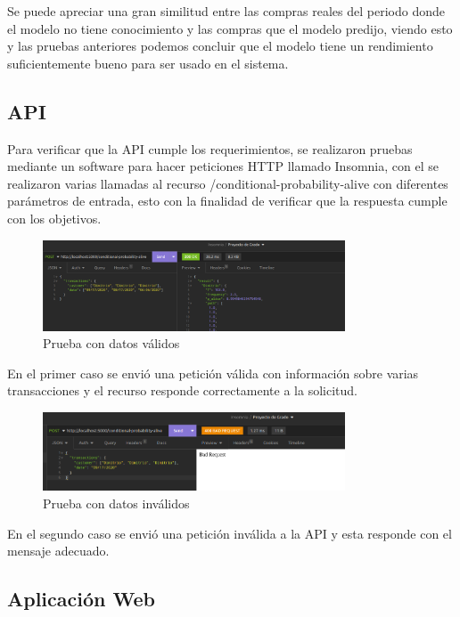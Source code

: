 Se puede apreciar una gran similitud entre las compras reales del periodo donde el modelo no tiene conocimiento y las compras que el modelo predijo, viendo esto y las pruebas anteriores podemos concluir que el modelo tiene un rendimiento suficientemente bueno para ser usado en el sistema.

\subsection{API}

Para verificar que la API cumple los requerimientos, se realizaron pruebas mediante un software para hacer peticiones HTTP llamado Insomnia, con el se realizaron varias llamadas al recurso /conditional-probability-alive con diferentes parámetros de entrada, esto con la finalidad de verificar que la respuesta cumple con los objetivos.

\begin{figure}[H]
	\centering \includegraphics[width=0.80\textwidth]{images/3.png}
	\caption{Prueba con datos válidos}
	\label{fig:api1}
\end{figure}

En el primer caso se envió una petición válida con información sobre varias transacciones y el recurso responde correctamente a la solicitud.

\begin{figure}[H]
	\centering \includegraphics[width=0.80\textwidth]{images/4.png}
	\caption{Prueba con datos inválidos}
	\label{fig:api2}
\end{figure}

En el segundo caso se envió una petición inválida a la API y esta responde con el mensaje adecuado.

\subsection{Aplicación Web}

